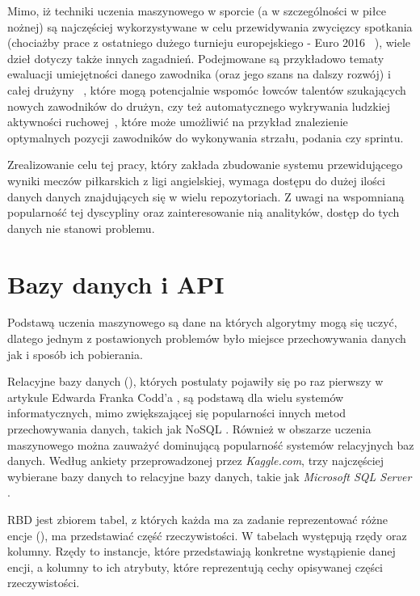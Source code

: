 Mimo, iż techniki uczenia maszynowego w sporcie (a w szczególności w piłce nożnej) są najczęściej wykorzystywane w celu przewidywania zwycięzcy spotkania (chociażby prace z ostatniego dużego turnieju europejskiego - Euro 2016~\cite{Euro2016-1} \cite{Euro2016-2} \cite{Euro2016-3}), wiele dzieł dotyczy także innych zagadnień. Podejmowane są przykładowo tematy ewaluacji umiejętności danego zawodnika (oraz jego szans na dalszy rozwój) i całej drużyny~\cite{ml_soccer_analytics} \cite{soccer_players_skill}, które mogą potencjalnie wspomóc łowców talentów szukających nowych zawodników do drużyn, czy też automatycznego wykrywania ludzkiej aktywności ruchowej~\cite{activity_recignition}, które może umożliwić na przykład znalezienie optymalnych pozycji zawodników do wykonywania strzału, podania czy sprintu.

Zrealizowanie celu tej pracy, który zakłada zbudowanie systemu przewidującego wyniki meczów piłkarskich z ligi angielskiej, wymaga dostępu do dużej ilości danych danych znajdujących się w wielu repozytoriach. Z uwagi na wspomnianą popularność tej dyscypliny oraz zainteresowanie nią analityków, dostęp do tych danych nie stanowi problemu.

\section{Bazy danych i API}
Podstawą uczenia maszynowego są dane na których algorytmy mogą się uczyć, dlatego jednym z postawionych problemów było miejsce przechowywania danych jak i sposób ich pobierania.

Relacyjne bazy danych (), których postulaty pojawiły się po raz pierwszy w artykule Edwarda Franka Codd'a \cite{Codd}, są podstawą dla wielu systemów informatycznych, mimo zwiększającej się popularności innych metod przechowywania danych, takich jak NoSQL \cite{RBD_popularity_2016}. Również w obszarze uczenia maszynowego można zauważyć dominującą popularność systemów relacyjnych baz danych. Według ankiety przeprowadzonej przez \textit{Kaggle.com}, trzy najczęściej wybierane bazy danych to relacyjne bazy danych, takie jak \textit{Microsoft SQL Server} \cite{RDB_popularity_kaggle_2020}.

RBD jest zbiorem tabel, z których każda ma za zadanie reprezentować różne encje (), ma przedstawiać część rzeczywistości. W tabelach występują rzędy oraz kolumny. Rzędy to instancje, które przedstawiają konkretne wystąpienie danej encji, a kolumny to ich atrybuty, które reprezentują cechy opisywanej części rzeczywistości. 

